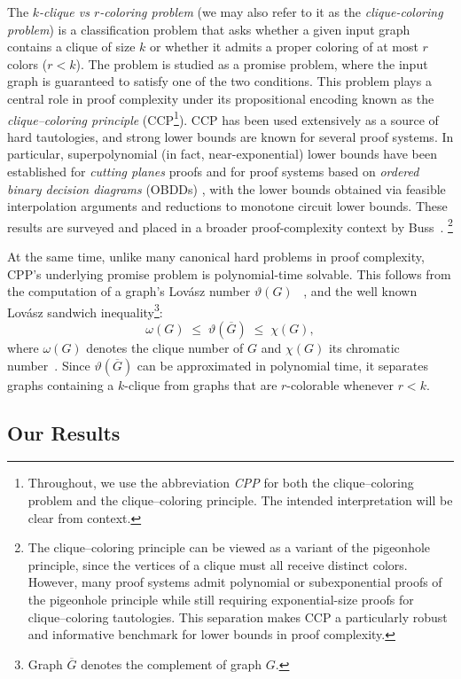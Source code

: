 The \emph{$k$-clique vs $r$-coloring problem} (we may also refer to it as the \emph{clique-coloring problem}) is a classification problem that asks whether a given input graph contains a clique of size $k$ or whether it admits a proper coloring of at most $r$ colors ($r < k$). The problem is studied as a promise problem, where the input graph is guaranteed to satisfy one of the two conditions. This problem plays a central role in proof complexity under its propositional encoding known as the \emph{clique--coloring principle} (CCP\footnote{Throughout, we use the abbreviation \emph{CPP} for both the clique–coloring problem and the clique–coloring principle. The intended interpretation will be clear from context.}). CCP has been used extensively as a source of hard tautologies, and strong lower bounds are known for several proof systems. In particular, superpolynomial (in fact, near-exponential) lower bounds have been established for \emph{cutting planes} proofs \citep{Pavel1997} and for proof systems based on \emph{ordered binary decision diagrams} (OBDDs) \citep{Nathan2008,Jan2008}, with the lower bounds obtained via feasible interpolation arguments and reductions to monotone circuit lower bounds. These results are surveyed and placed in a broader proof-complexity context by Buss~\citep{BUSS2012906}.
\footnote{The clique--coloring principle can be viewed as a variant of the pigeonhole principle, since the vertices of a clique must all receive distinct colors. However, many proof systems admit polynomial or subexponential proofs of the pigeonhole principle while still requiring exponential-size proofs for clique--coloring tautologies. This separation makes CCP a particularly robust and informative benchmark for lower bounds in proof complexity.}

At the same time, unlike many canonical hard problems in proof complexity, CPP's underlying promise problem is polynomial-time solvable. This follows from the computation of a graph's Lov\'asz number $\vartheta(G)$ ~\citep{Lovasz1979,GroetschelLovaszSchrijver1981}, and the well known Lov\'asz sandwich inequality\footnote{Graph $\overline{G}$ denotes the complement of graph $G$.}:
\[
\omega(G) \;\le\; \vartheta(\overline{G}) \;\le\; \chi(G),
\]
where $\omega(G)$ denotes the clique number of $G$ and $\chi(G)$ its chromatic number~\citep{Knuth1994,Goemans1997}. Since $\vartheta(\overline{G})$ can be approximated in polynomial time, it separates graphs containing a $k$-clique from graphs that are $r$-colorable whenever $r<k$.

\subsection{Our Results}

